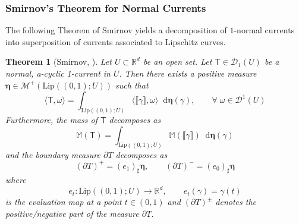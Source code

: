 \documentclass[11pt, twoside, reqno]{amsart}
\newtheorem{thm}{Theorem}[section]
\theoremstyle{definition}
\theoremstyle{remark}
\numberwithin{equation}{section}
\newcommand*\dif{\mathop{}\!\mathrm{d}}
\newcommand{\ms}[1]{\mathsf{#1}}
\begin{document}
\subsubsection{Smirnov's Theorem for Normal Currents}
The following Theorem of Smirnov yields a decomposition of $1$-normal currents into superposition of currents associated to Lipschitz curves.
\begin{thm}[Smirnov, \cite{smirnov_currents}]\label{thm:smirnov}
Let $U \subset \mathbb R^d$ be an open set. Let $\ms T \in \mathscr D_1(U)$ be a normal, a-cyclic 1-current in $U$. Then there exists a positive measure $\boldsymbol{\eta} \in \mathscr M^+(\mathrm{Lip}((0,1)  ;  U))$ such that 
\begin{equation}\label{eq:Tdecomp}
    \langle \ms T, \omega \rangle = \int_{\mathrm{Lip}((0,1)  ;  U)} \langle \llbracket\gamma\rrbracket, \omega\rangle \dif \boldsymbol{\eta} (\gamma), \qquad \forall \; \omega \in \mathscr D^1(U)
\end{equation}
Furthermore, the mass of $\ms T$ decomposes as 
\begin{equation}\label{eq:Mdecomp}
    \mathbb M (\ms T)  =  \int_{\mathrm{Lip}((0,1)  ; U)}  \mathbb M (\llbracket\gamma\rrbracket) \dif \boldsymbol{\eta} (\gamma)
\end{equation}
and the boundary measure $\partial T$ decomposes as 
\begin{equation}\label{eq:dTdecomp}
    (\partial T)^+ = (e_1)_{\sharp} \boldsymbol{\eta}, \qquad  (\partial T)^- = (e_0)_{\sharp} \boldsymbol{\eta}
\end{equation}
where 
$$
e_t : \mathrm{Lip}((0,1)  ;  U) \to \mathbb R^d, \qquad e_t(\gamma) = \gamma(t)
$$
is the evaluation map at a point $t \in (0, 1)$ 
and $(\partial T)^{\pm}$ denotes the positive/negative part of the measure $\partial T$.
\end{thm}
\end{document}
